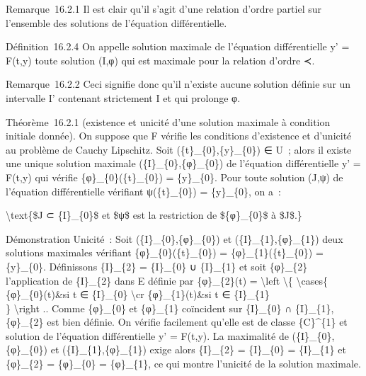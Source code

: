 \documentclass[]{article}
\begin{document}
Remarque~16.2.1 Il est clair qu'il s'agit d'une relation d'ordre partiel
sur l'ensemble des solutions de l'équation différentielle.

Définition~16.2.4 On appelle solution maximale de l'équation
différentielle y' = F(t,y) toute solution (I,φ) qui est maximale pour la
relation d'ordre ≺.

Remarque~16.2.2 Ceci signifie donc qu'il n'existe aucune solution
définie sur un intervalle I' contenant strictement I et qui prolonge φ.

Théorème~16.2.1 (existence et unicité d'une solution maximale à
condition initiale donnée). On suppose que F vérifie les conditions
d'existence et d'unicité au problème de Cauchy Lipschitz. Soit
(\{t\}\_\{0\},\{y\}\_\{0\}) ∈ U~; alors il existe une unique solution
maximale (\{I\}\_\{0\},\{φ\}\_\{0\}) de l'équation différentielle y' =
F(t,y) qui vérifie \{φ\}\_\{0\}(\{t\}\_\{0\}) = \{y\}\_\{0\}. Pour toute
solution (J,ψ) de l'équation différentielle vérifiant ψ(\{t\}\_\{0\}) =
\{y\}\_\{0\}, on a~:

\textbackslash{}text\{\$J ⊂ \{I\}\_\{0\}\$ et \$ψ\$ est la restriction
de \$\{φ\}\_\{0\}\$ à \$J\$.\}

Démonstration Unicité~: Soit (\{I\}\_\{0\},\{φ\}\_\{0\}) et
(\{I\}\_\{1\},\{φ\}\_\{1\}) deux solutions maximales vérifiant
\{φ\}\_\{0\}(\{t\}\_\{0\}) = \{φ\}\_\{1\}(\{t\}\_\{0\}) = \{y\}\_\{0\}.
Définissons \{I\}\_\{2\} = \{I\}\_\{0\} ∪ \{I\}\_\{1\} et soit
\{φ\}\_\{2\} l'application de \{I\}\_\{2\} dans E définie par
\{φ\}\_\{2\}(t) = \textbackslash{}left \textbackslash{}\{
\textbackslash{}cases\{ \{φ\}\_\{0\}(t)\&si t ∈ \{I\}\_\{0\}
\textbackslash{}cr \{φ\}\_\{1\}(t)\&si t ∈ \{I\}\_\{1\}\\ \}
\textbackslash{}right .. Comme \{φ\}\_\{0\} et \{φ\}\_\{1\} coïncident
sur \{I\}\_\{0\} ∩ \{I\}\_\{1\}, \{φ\}\_\{2\} est bien définie. On
vérifie facilement qu'elle est de classe \{C\}\^{}\{1\} et solution de
l'équation différentielle y' = F(t,y). La maximalité de
(\{I\}\_\{0\},\{φ\}\_\{0\}) et (\{I\}\_\{1\},\{φ\}\_\{1\}) exige alors
\{I\}\_\{2\} = \{I\}\_\{0\} = \{I\}\_\{1\} et \{φ\}\_\{2\} =
\{φ\}\_\{0\} = \{φ\}\_\{1\}, ce qui montre l'unicité de la solution
maximale.
\end{document}
